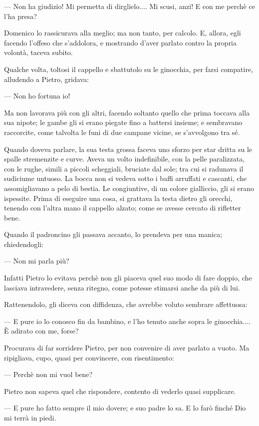 — Non ha giudizio! Mi permetta di dirglielo.... Mi scusi, anzi! E con me perchè ce l'ha presa?

Domenico lo rassicurava alla meglio; ma non tanto, per calcolo. E, allora, egli facendo l'offeso che s'addolora, e mostrando d'aver parlato contro la propria volontà, taceva subito.

Qualche volta, toltosi il cappello e sbattutolo su le ginocchia, per farsi compatire, alludendo a Pietro, gridava:

— Non ho fortuna io!

Ma non lavorava più con gli altri, facendo soltanto quello che prima toccava alla sua nipote; le gambe gli si erano piegate fino a battersi insieme; e sembravano raccorcite, come talvolta le funi di due campane vicine, se s'avvolgono tra sé.

Quando doveva parlare, la sua testa grossa faceva uno sforzo per star dritta su le spalle stremenzite e curve. Aveva un volto indefinibile, con la pelle paralizzata, con le rughe, simili a piccoli scheggiali, bruciate dal sole; tra cui si radunava il sudiciume untuoso. La bocca non si vedeva sotto i baffi arruffati e cascanti, che assomigliavano a pelo di bestia. Le congiuntive, di un colore gialliccio, gli si erano ispessite. Prima di eseguire una cosa, si grattava la testa dietro gli orecchi, tenendo con l'altra mano il cappello alzato; come se avesse cercato di rifletter bene.

Quando il padroncino gli passava accanto, lo prendeva per una manica; chiedendogli:

— Non mi parla più?

Infatti Pietro lo evitava perchè non gli piaceva quel suo modo di fare doppio, che lasciava intravedere, senza ritegno, come potesse stimarsi anche da più di lui.

Rattenendolo, gli diceva con diffidenza, che avrebbe voluto sembrare affettuosa:

— E pure io lo conosco fin da bambino, e l'ho tenuto anche sopra le ginocchia.... È adirato con me, forse?

Procurava di far sorridere Pietro, per non convenire di aver parlato a vuoto. Ma ripigliava, cupo, quasi per convincere, con risentimento:

— Perchè non mi vuol bene?

Pietro non sapeva quel che rispondere, contento di vederlo quasi supplicare.

— E pure ho fatto sempre il mio dovere; e suo padre lo sa. E lo farò finché Dio mi terrà in piedi.


